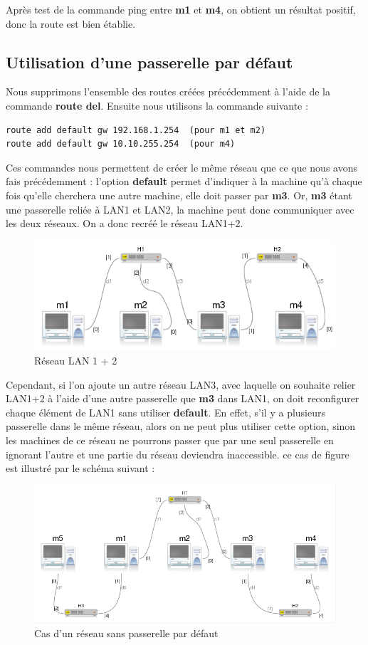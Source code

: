 \documentclass{article}
\begin{document}
Après test de la commande ping entre \textbf{m1} et \textbf{m4}, on obtient un résultat positif, donc la route est bien établie.

\subsection{Utilisation d'une passerelle par défaut}

Nous supprimons l’ensemble des routes créées précédemment à l'aide de la commande \textbf{route del}. Ensuite nous utilisons la commande suivante :
\begin{verbatim}
route add default gw 192.168.1.254  (pour m1 et m2)
route add default gw 10.10.255.254  (pour m4)
\end{verbatim}

Ces commandes nous permettent de créer le même réseau que ce que nous avons fais précédemment : l'option \textbf{default} permet d'indiquer à la machine qu'à chaque fois qu'elle cherchera une autre machine, elle doit passer par \textbf{m3}. Or, \textbf{m3} étant une passerelle reliée à LAN1 et LAN2, la machine peut donc communiquer avec les deux réseaux. On a donc recréé le réseau LAN1+2.
\begin{figure}[h]
\centering
\includegraphics[scale=0.5]{capture-1-passerelle.png}
\caption{Réseau LAN 1 + 2}
\end{figure}

Cependant, si l'on ajoute un autre réseau LAN3, avec laquelle on souhaite relier LAN1+2 à l'aide d'une autre passerelle que \textbf{m3} dans LAN1, on  doit reconfigurer chaque élément de LAN1 sans utiliser \textbf{default}. En effet, s'il y a plusieurs passerelle dans le même réseau, alors on ne peut plus utiliser cette option, sinon les machines de ce réseau ne pourrons passer que par une seul passerelle en ignorant l'autre et une partie du réseau deviendra inaccessible. ce cas de figure est illustré par le schéma suivant : 
\begin{figure}[h]
\centering
\includegraphics[scale=0.5]{capture-deux-passerelles.png}
\caption{Cas d'un réseau sans passerelle par défaut}
\end{figure} \newpage
\end{document}
